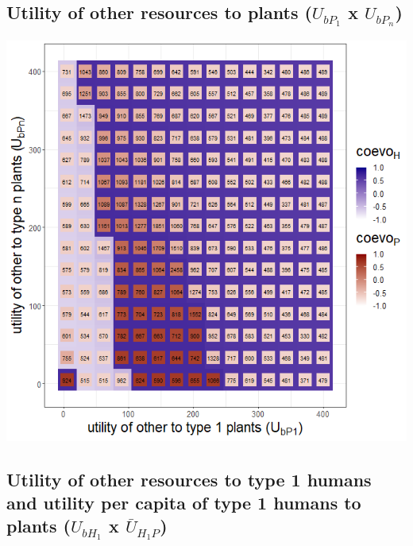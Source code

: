 \documentclass[
]{book}
\begin{document}
\newpage

\hypertarget{utility-of-other-resources-to-plants-u_bp_1-x-u_bp_n}{%
\subsection{\texorpdfstring{Utility of other resources to plants (\(U_{bP_{1}}\) x \(U_{bP_{n}}\))}{Utility of other resources to plants (U\_\{bP\_\{1\}\} x U\_\{bP\_\{n\}\})}}\label{utility-of-other-resources-to-plants-u_bp_1-x-u_bp_n}}


\includegraphics[width=1\linewidth]{plots/3_exp_utility_other_to_type_plants-tripleRaster_twoParameters}

\hypertarget{utility-of-other-resources-to-type-1-humans-and-utility-per-capita-of-type-1-humans-to-plants-u_bh_1-x-baru_h_1p}{%
\subsection{\texorpdfstring{Utility of other resources to type 1 humans and utility per capita of type 1 humans to plants (\(U_{bH_{1}}\) x \(\bar{U}_{H_{1}P}\))}{Utility of other resources to type 1 humans and utility per capita of type 1 humans to plants (U\_\{bH\_\{1\}\} x \textbackslash bar\{U\}\_\{H\_\{1\}P\})}}\label{utility-of-other-resources-to-type-1-humans-and-utility-per-capita-of-type-1-humans-to-plants-u_bh_1-x-baru_h_1p}}
\end{document}
